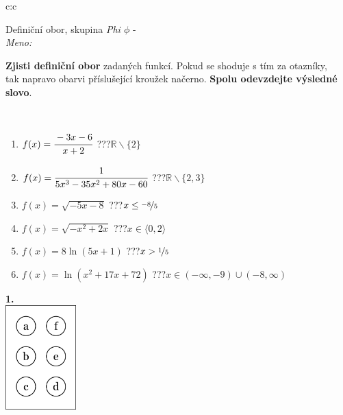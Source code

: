 \documentclass[10pt]{report}
\begin{document}
\begin{tabular}{c:c}
\begin{minipage}[c][104.5mm][t]{0.5\linewidth}
\begin{center}
\vspace{7mm}
{\huge Definiční obor, skupina \textit{Phi $\phi$} -}\\[5mm]
\textit{Meno:}\phantom{xxxxxxxxxxxxxxxxxxxxxxxxxxxxxxxxxxxxxxxxxxxxxxxxxxxxxxxxxxxxxxxxx}\\[5mm]
\begin{minipage}{0.95\linewidth}
\textbf{Zjisti definiční obor} zadaných funkcí. Pokud se shoduje s tím za otazníky,\\tak napravo obarvi příslušející kroužek načerno. \textbf{Spolu odevzdejte výsledné slovo}.
\end{minipage}
\\[1mm]
\begin{minipage}{0.79\linewidth}
\begin{center}
\begin{varwidth}{\linewidth}
\begin{enumerate}
\normalsizerrr
\item $f(x)=\cfrac{-3x-6}{x+2}$\quad \dotfill\; ???\;\dotfill \quad $\mathbb{R}\smallsetminus\{2\}$
\item $f(x)=\cfrac{1}{5x^3-35x^2+80x-60}$\quad \dotfill\; ???\;\dotfill \quad $\mathbb{R}\smallsetminus\{2,3\}$
\item $f(x)=\sqrt{-5x-8}$\quad \dotfill\; ???\;\dotfill \quad $x\leq\nicefrac{-8}{5}$
\item $f(x)=\sqrt{-x^2+2x}$\quad \dotfill\; ???\;\dotfill \quad $x\in\langle0 , 2\rangle$
\item $f(x)=8\ln{(5x+1)}$\quad \dotfill\; ???\;\dotfill \quad $x>\nicefrac{1}{5}$
\item $f(x)=\ln{(x^2+17x+72)}$\quad \dotfill\; ???\;\dotfill \quad $x\in(-\infty , -9)\cup(-8 , \infty)$
\end{enumerate}
\end{varwidth}
\end{center}
\end{minipage}
\begin{minipage}{0.20\linewidth}
\begin{center}
{\Huge\bfseries 1.} \\[2mm]
\includegraphics[height=40mm]{../images/braille.png}

\end{center}
\end{minipage}
\end{center}
\end{minipage}
\end{tabular}
\end{document}
